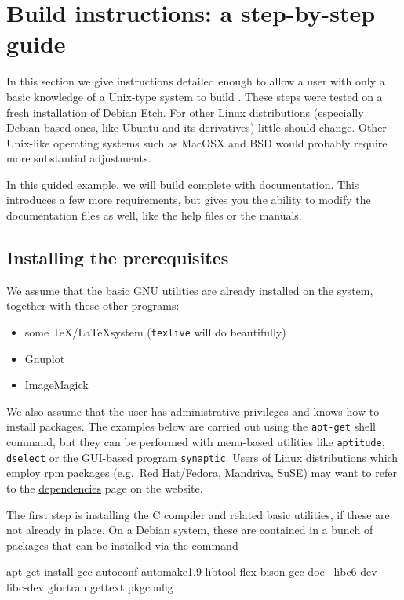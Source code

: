 \section{Build instructions: a step-by-step guide}
\label{sec:build-inst}

In this section we give instructions detailed enough to allow a user
with only a basic knowledge of a Unix-type system to build .
These steps were tested on a fresh installation of Debian Etch. For
other Linux distributions (especially Debian-based ones, like Ubuntu
and its derivatives) little should change. Other Unix-like operating
systems such as MacOSX and BSD would probably require more substantial
adjustments.

In this guided example, we will build  complete with
documentation.  This introduces a few more requirements, but gives you
the ability to modify the documentation files as well, like the help
files or the manuals.

\subsection{Installing the prerequisites}

We assume that the basic GNU utilities are already installed on the
system, together with these other programs:
\begin{itemize}
\item some \TeX/\LaTeX system (\texttt{texlive} will do beautifully)
\item Gnuplot
\item ImageMagick
\end{itemize}
We also assume that the user has administrative privileges and knows
how to install packages.  The examples below are carried out using the
\texttt{apt-get} shell command, but they can be performed with
menu-based utilities like \texttt{aptitude}, \texttt{dselect} or the
GUI-based program \texttt{synaptic}. Users of Linux distributions
which employ rpm packages (e.g.\ Red Hat/Fedora, Mandriva, SuSE) may
want to refer to the
\href{http://gretl.sourceforge.net/depend.html}{dependencies} page on
the  website.

The first step is installing the C compiler and related basic
utilities, if these are not already in place. On a Debian system,
these are contained in a bunch of packages that can be installed via
the command
\begin{code}
apt-get install gcc autoconf automake1.9 libtool flex bison gcc-doc \
libc6-dev libc-dev gfortran gettext pkgconfig
\end{code}

